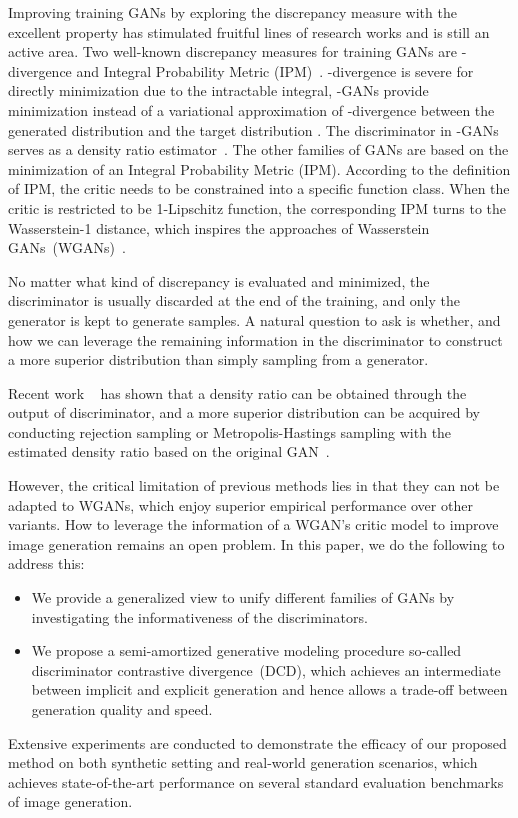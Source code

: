 \documentclass{article}
\begin{document}
Improving training GANs by exploring the discrepancy measure with the excellent property has stimulated fruitful lines of research works and is still an active area. Two well-known discrepancy measures for training GANs are -divergence and Integral Probability Metric (IPM)~\cite{muller1997integral}. -divergence is severe for directly minimization due to the intractable integral, -GANs provide minimization instead of a variational approximation of -divergence between the generated distribution  and the target distribution . The discriminator in -GANs serves as a density ratio estimator~\cite{uehara2016generative}.
The other families of GANs are based on the minimization of an Integral Probability Metric (IPM). According to the definition of IPM, the critic needs to be constrained into a specific function class. When the critic is restricted to be 1-Lipschitz function, the corresponding IPM turns to the Wasserstein-1 distance, which inspires the approaches of  Wasserstein GANs~(WGANs)~\cite{miyato2018spectral,arjovsky2017wasserstein,gulrajani2017improved}.

No matter what kind of discrepancy is evaluated and minimized, the discriminator is usually discarded at the end of the training, and only the generator is kept to generate samples. A natural question to ask is whether, and how we can leverage the remaining information in the discriminator to construct a more superior distribution than simply sampling from a generator. 

Recent work ~\cite{azadi2018discriminator,turner2018metropolis} has shown that a density ratio can be obtained through the output of discriminator, and a more superior distribution can be acquired by conducting rejection sampling or Metropolis-Hastings sampling with the estimated density ratio based on the original GAN~\cite{goodfellow2014generative}.

However, the critical limitation of previous methods lies in that they can not be adapted to WGANs, which enjoy superior empirical performance over other variants. How to leverage the information of a WGAN's critic model to improve image generation remains an open problem. In this paper, we do the following to address this: 

\begin{itemize}
\vspace{-3pt}
    \item We provide a generalized view to unify different families of GANs by investigating the informativeness of the discriminators.
    \vspace{-1pt}
    \item We propose a semi-amortized generative modeling procedure so-called discriminator contrastive divergence~(DCD), which achieves an intermediate between implicit and explicit generation and hence allows a trade-off between generation quality and speed.
\vspace{-3pt}
\end{itemize}
Extensive experiments are conducted to demonstrate the efficacy of our proposed method on both synthetic setting and real-world generation scenarios, which achieves state-of-the-art performance on several standard evaluation benchmarks of image generation.
\end{document}
